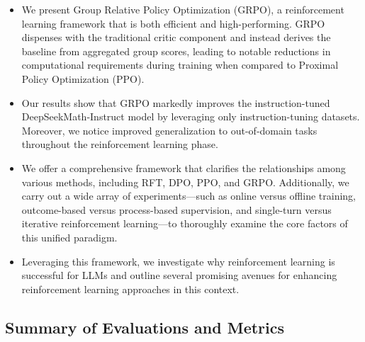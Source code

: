 \begin{itemize}[topsep=0pt]
    \item We present Group Relative Policy Optimization (GRPO), a reinforcement learning framework that is both efficient and high-performing. GRPO dispenses with the traditional critic component and instead derives the baseline from aggregated group scores, leading to notable reductions in computational requirements during training when compared to Proximal Policy Optimization (PPO).
    \item Our results show that GRPO markedly improves the instruction-tuned DeepSeekMath-Instruct model by leveraging only instruction-tuning datasets. Moreover, we notice improved generalization to out-of-domain tasks throughout the reinforcement learning phase.
    \item We offer a comprehensive framework that clarifies the relationships among various methods, including RFT, DPO, PPO, and GRPO. Additionally, we carry out a wide array of experiments—such as online versus offline training, outcome-based versus process-based supervision, and single-turn versus iterative reinforcement learning—to thoroughly examine the core factors of this unified paradigm.
    \item Leveraging this framework, we investigate why reinforcement learning is successful for LLMs and outline several promising avenues for enhancing reinforcement learning approaches in this context.
\end{itemize}

\subsection{Summary of Evaluations and Metrics}

